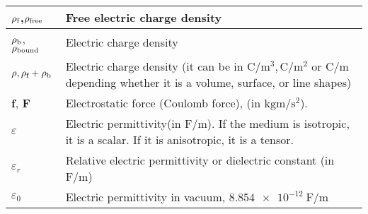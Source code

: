 \begin{xltabular}{\textwidth}{XX}
	\(\rho_\textnormal{f}\)\cite{wiki:electric-density-flux-sec:definition},\(\rho_{\textnormal{free}}\) \cite{wiki:D-field-flux}            & Free electric charge density                                                                                                                                                             \\ \hline
	\(\rho_\textnormal{b}\)\cite{wiki:electric-density-flux-sec:definition}, \(\rho_{\textnormal{bound}}\) \cite{wiki:D-field-flux}          & Electric charge density                                                                                                                                                                  \\ \hline
	\(\rho, \rho_{\textnormal{f}}+\rho_{\textnormal{b}}\)                                                                                    & Electric charge density (it can be in \(\si{\coulomb\per\meter^3}, \si{\coulomb\per\meter^2}\) or \(\si{\coulomb\per\meter}\) depending whether it is a volume, surface, or line shapes) \\ \hline
	\(\mathbf{f}\)\cite{ramoFieldsWavesCommunication1994}, \(\mathbf{F}\)\cite{wiki:coulomb-law}                                             & Electrostatic force (Coulomb force), (in \(\si{\kilo\gram\meter\per\second\squared}\)).                                                                                                  \\ \hline
	\(\varepsilon\)                                                                                                                          & Electric permittivity(in \(\si{\farad\per\meter}\)). If the medium is isotropic, it is a scalar. If it is anisotropic, it is a tensor. \cite{ramoFieldsWavesCommunication1994}           \\ \hline
	\(\varepsilon_r\)                                                                                                                        & Relative electric permittivity or dielectric constant (in \(\si{\farad\per\meter}\)) \cite{ramoFieldsWavesCommunication1994}                                                             \\ \hline
	\(\varepsilon_0\)                                                                                                                        & Electric permittivity in vacuum, \(\SI{8.854e-12}{\farad\per\meter}\) \cite{ramoFieldsWavesCommunication1994}                                                                            \\ \hline

\end{xltabular}
